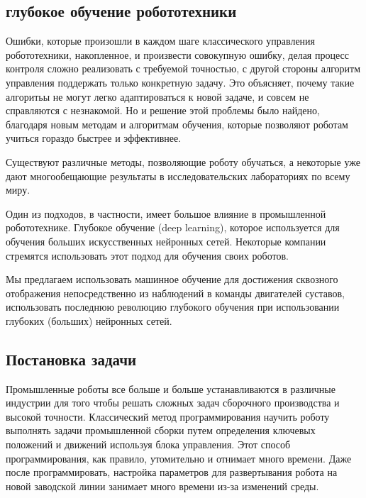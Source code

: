 \documentclass[a4paper,12pt]{article}
\begin{document}
\subsection{глубокое обучение робототехники}
Ошибки, которые произошли в каждом шаге классического управления робототехники, накопленное, и произвести совокупную ошибку, делая процесс контроля сложно реализовать с требуемой точностью, с другой стороны алгоритм управления поддержать только конкретную задачу. Это объясняет, почему такие алгоритьы не могут легко адаптироваться к новой задаче, и совсем не справляются с незнакомой. Но и решение этой проблемы было найдено, благодаря новым методам и алгоритмам обучения, которые позволяют роботам учиться гораздо быстрее и эффективнее.\par
Существуют различные методы, позволяющие роботу обучаться, а некоторые уже дают многообещающие результаты в исследовательских лабораториях по всему миру.\par
Один из подходов, в частности, имеет большое влияние в промышленной робототехнике. Глубокое обучение (deep learning), которое используется для обучения больших искусственных нейронных сетей. Некоторые компании стремятся использовать этот подход для обучения своих роботов.\par
Мы предлагаем использовать машинное обучение для достижения сквозного отображения непосредственно из наблюдений в команды двигателей суставов, использовать последнюю революцию глубокого обучения при использовании глубоких (больших) нейронных сетей.
\begin{center}
\end{center}
\newpage

\subsection{Постановка задачи}

Промышленные роботы все больше и больше устанавливаются в различные индустрии для того чтобы решать сложных задач сборочного производства и высокой точности. Классический метод программирования научить роботу выполнять задачи промышленной сборки путем определения ключевых положений и движений используя блока управления. Этот способ программирования, как правило, утомительно и отнимает много времени. Даже после программировать, настройка параметров для развертывания робота на новой заводской линии занимает много времени из-за изменений среды.
\end{document}
